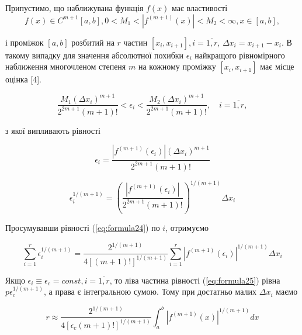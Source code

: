 \documentclass[ukrainian,14pt]{extarticle}
\begin{document}

Припустимо, що наближувана функція $f(x)$ має властивості 
\begin{equation}\label{eq:formula__function_properties}
f(x) \in C^{m+1}[a,b], 0 < M_1 < |f^{(m+1)}(x)| < M_2 < \infty, x \in [a, b],
\end{equation}

і проміжок $[a, b]$ розбитий на $r$ частин $[x_i, x_{i+1}], i=\overline{1, r}$,
$\Delta x_i = x_{i+1} - x_i$. В такому випадку для значення абсолютної похибки $\epsilon_i$ найкращого рівномірного наближення многочленом степеня $m$ на кожному проміжку $[x_i, x_{i+1}]$ має місце оцінка [4].


\begin{equation}\label{eq:formula22}
    \frac {M_1(\Delta x_i)^{m+1}} {2^{2m+1} (m+1)!} < \epsilon_i < \frac {M_2(\Delta x_i)^{m+1}} {2^{2m+1} (m+1)!}, \quad i = \overline{1, r} ,
\end{equation}

з якої випливають рівності

\begin{equation}\label{eq:formula_epsilon_i}
    \epsilon_i = \frac {|f^{(m+1)}(\epsilon_i)|(\Delta x_i)^{m+1}} {2^{2m+1} (m+1)!}
\end{equation}

\begin{equation}\label{eq:formula24}
    \epsilon_i^{1/(m+1)} = \left(\frac {|f^{(m+1)}(\epsilon_i)|} {2^{2m+1} (m+1)!} \right)^{1/(m+1)} \Delta x_i
\end{equation}


Просумувавши рівності (\ref{eq:formula24}) по $i$, отримуємо

\begin{equation}\label{eq:formula25}
  \sum_{i=1}^r \epsilon_i ^{1/(m+1)} = \frac{2^{1/(m+1)}}{4 [(m+1)!]^{1/(m+1)}} \sum_{i=1}^r |f^{(m+1)}(\epsilon_i)|^{1/(m+1)} \Delta x_i  
\end{equation}

Якщо $\epsilon_i \equiv \epsilon_c = const, i = \overline{1, r}$, то ліва частина рівності (\ref{eq:formula25}) рівна $p \epsilon_c ^{1/(m+1)}$, а права є інтегральною сумою. Тому при достатньо малих $\Delta x_i$ маємо

\begin{equation}\label{eq:formula26}
    r \approx \frac{2^{1/(m+1)}}{4[\epsilon_c (m+1)!]^{1/(m+1)}} \int_a^b |f^{(m+1)}(x)|^{1/(m+1)}dx
\end{equation}
\end{document}
